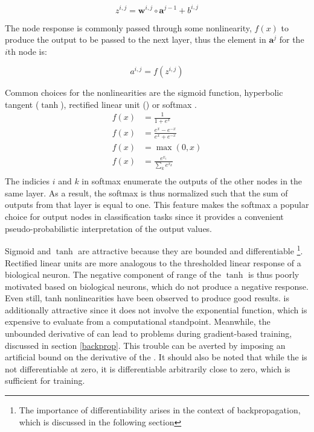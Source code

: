 \begin{equation}
z^{i,j} = \mathbf{w}^{i,j} \circ \mathbf{a}^{j-1} + b^{i,j}
\end{equation}

The node response is commonly passed through some nonlinearity, $f(x)$ to produce the output to be passed to the next layer, thus the element in $\mathbf{a}^{j}$ for the $i$th node is:

\begin{equation}
a^{i, j} = f(z^{i,j})
\end{equation}

Common choices for the nonlinearities are the sigmoid function, hyperbolic
tangent ($\tanh$), rectified linear unit (\relu) or softmax
\cite{krizhevsky2012imagenet,lecun2015deep,reed1999neural,szegedy2014going}.
\begin{align}
f(x) &= \frac{1}{1+e^x}  \tag{Sigmoid}\\
f(x) &= \frac{e^x-e^{-x}}{e^x+e^{-x}} \tag{$\tanh$} \\
f(x) &= \max(0,x) \tag{\relu}  \\
f(x) &= \frac{e^{x_i}}{\sum_{k} e^{x_k}} \tag{Softmax}  \\
\end{align}
The indicies $i$ and $k$ in softmax enumerate the outputs of the other nodes
in the same layer.
As a result, the softmax is thus normalized such that the sum of outputs from
that layer is equal to one.
This feature makes the softmax a popular choice for output nodes in classification tasks since it provides a convenient pseudo-probabilistic interpretation of the output values.

Sigmoid and $\tanh$ are attractive because they are bounded and differentiable
\footnote{The importance of differentiability arises in the context of
backpropagation, which is discussed in the following section}.  Rectified linear units are more analogous to the thresholded linear response of a biological neuron.  The negative component of range of the $\tanh$ is thus poorly motivated based on biological neurons, which do not produce a negative response.
Even still, tanh nonlinearities have been observed to produce good results.
\relu is additionally attractive since it does not involve the exponential function, which is expensive to evaluate from a computational standpoint.
Meanwhile, the unbounded derivative of \relu can lead to problems during gradient-based training, discussed in section \ref{backprop}.
This trouble can be averted by imposing an artificial bound on the derivative
of the \relu.
It should also be noted that while the \relu is not differentiable at zero, it is differentiable arbitrarily close to zero, which is sufficient for training.

